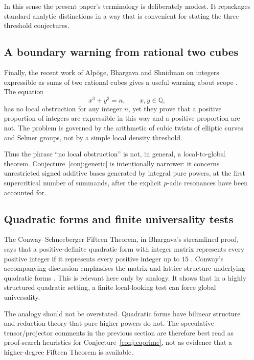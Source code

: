 \documentclass[../Axiomathic.tex]{subfiles}
\newcommand{\Q}{\mathbb Q}
\begin{document}
In this sense the present paper's terminology is deliberately modest.  It repackages standard analytic distinctions in a way that is convenient for stating the three threshold conjectures.

\subsection{A boundary warning from rational two cubes}

Finally, the recent work of Alp\"oge, Bhargava and Shnidman on integers expressible as sums of two rational cubes gives a useful warning about scope \cite{AlpogeBhargavaShnidman}.  The equation
\[
  x^3+y^3=n,\qquad x,y\in\Q,
\]
has no local obstruction for any integer $n$, yet they prove that a positive proportion of integers are expressible in this way and a positive proportion are not.  The problem is governed by the arithmetic of cubic twists of elliptic curves and Selmer groups, not by a simple local density threshold.

Thus the phrase ``no local obstruction'' is not, in general, a local-to-global theorem.  Conjecture~\ref{conj:generic} is intentionally narrower: it concerns unrestricted signed additive bases generated by integral pure powers, at the first supercritical number of summands, after the explicit $p$-adic resonances have been accounted for.

\subsection{Quadratic forms and finite universality tests}

The Conway--Schneeberger Fifteen Theorem, in Bhargava's streamlined proof, says that a positive-definite quadratic form with integer matrix represents every positive integer if it represents every positive integer up to $15$ \cite{Bhargava2000}.  Conway's accompanying discussion emphasises the matrix and lattice structure underlying quadratic forms \cite{Conway2000}.  This is relevant here only by analogy.  It shows that in a highly structured quadratic setting, a finite local-looking test can force global universality.

The analogy should not be overstated.  Quadratic forms have bilinear structure and reduction theory that pure higher powers do not.  The speculative tensor/projector comments in the previous section are therefore best read as proof-search heuristics for Conjecture~\ref{conj:coprime}, not as evidence that a higher-degree Fifteen Theorem is available.
\end{document}
